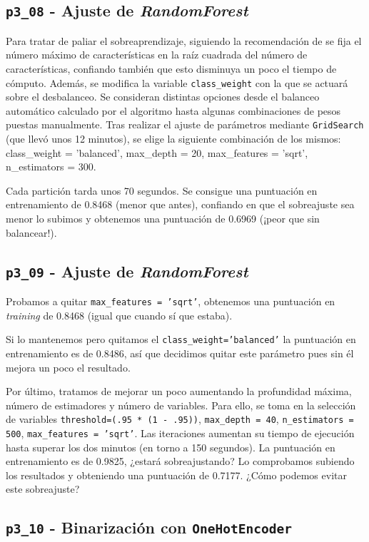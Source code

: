 \documentclass[a4paper, 20pt]{article}
\begin{document}
\subsection{\texttt{p3\_08} - Ajuste de \textit{RandomForest}}

Para tratar de paliar el sobreaprendizaje, siguiendo la recomendación de \cite{noauthor_1.11._nodate} se fija el número máximo de características en la raíz cuadrada del número de características, confiando también que esto disminuya un poco el tiempo de cómputo. Además, se modifica la variable \texttt{class\_weight} con la que se actuará sobre el desbalanceo. Se consideran distintas opciones desde el balanceo automático calculado por el algoritmo hasta algunas combinaciones de pesos puestas manualmente. Tras realizar el ajuste de parámetros mediante \texttt{GridSearch} (que llevó unos 12 minutos), se elige la siguiente combinación de los mismos: {\ttfamily class\_weight = 'balanced', max\_depth = 20, max\_features = 'sqrt', n\_estimators = 300}.

Cada partición tarda unos 70 segundos. Se consigue una puntuación en entrenamiento de 0.8468 (menor que antes), confiando en que el sobreajuste sea menor lo subimos y obtenemos una puntuación de 0.6969 (¡peor que sin balancear!).

\subsection{\texttt{p3\_09} - Ajuste de \textit{RandomForest}}
Probamos a quitar \texttt{max\_features = 'sqrt'}, obtenemos una puntuación en \textit{training} de 0.8468 (igual que cuando sí que estaba).

Si lo mantenemos pero quitamos el \texttt{class\_weight='balanced'} la puntuación en entrenamiento es de 0.8486, así que decidimos quitar este parámetro pues sin él mejora un poco el resultado.

Por último, tratamos de mejorar un poco aumentando la profundidad máxima, número de estimadores y número de variables. Para ello, se toma en la selección de variables \texttt{threshold=(.95 * (1 - .95))}, \texttt{max\_depth = 40}, \texttt{n\_estimators = 500}, \texttt{max\_features = 'sqrt'}. Las iteraciones aumentan su tiempo de ejecución hasta superar los dos minutos (en torno a 150 segundos). La puntuación en entrenamiento es de 0.9825, ¿estará sobreajustando? Lo comprobamos subiendo los resultados y obteniendo una puntuación de 0.7177. ¿Cómo podemos evitar este sobreajuste?

\subsection{\texttt{p3\_10} - Binarización con \texttt{OneHotEncoder}}
\end{document}
